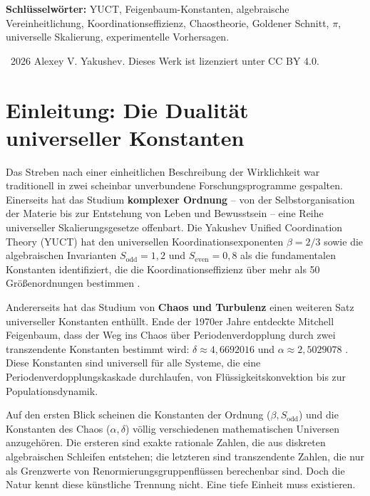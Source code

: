\documentclass[12pt,a4paper]{article}
\begin{document}
	\vspace{1cm}
	\noindent
	\small\textbf{Schlüsselwörter:} YUCT, Feigenbaum-Konstanten, algebraische Vereinheitlichung, Koordinationseffizienz, Chaostheorie, Goldener Schnitt, \(\pi\), universelle Skalierung, experimentelle Vorhersagen.
	
	\vspace{0.5cm}
	\noindent
	\textcopyright\ 2026 Alexey V. Yakushev. Dieses Werk ist lizenziert unter CC BY 4.0.
	
	\tableofcontents
	\newpage
	
	\section{Einleitung: Die Dualität universeller Konstanten}
	
	Das Streben nach einer einheitlichen Beschreibung der Wirklichkeit war traditionell in zwei scheinbar unverbundene Forschungsprogramme gespalten. Einerseits hat das Studium \textbf{komplexer Ordnung} – von der Selbstorganisation der Materie bis zur Entstehung von Leben und Bewusstsein – eine Reihe universeller Skalierungsgesetze offenbart. Die Yakushev Unified Coordination Theory (YUCT) hat den universellen Koordinationsexponenten \(\beta = 2/3\) sowie die algebraischen Invarianten \(S_{\mathrm{odd}} = 1{,}2\) und \(S_{\mathrm{even}} = 0{,}8\) als die fundamentalen Konstanten identifiziert, die die Koordinationseffizienz über mehr als 50 Größenordnungen bestimmen \cite{Yakushev2026, AppendixAF}.
	
	Andererseits hat das Studium von \textbf{Chaos und Turbulenz} einen weiteren Satz universeller Konstanten enthüllt. Ende der 1970er Jahre entdeckte Mitchell Feigenbaum, dass der Weg ins Chaos über Periodenverdopplung durch zwei transzendente Konstanten bestimmt wird: \(\delta \approx 4{,}6692016\) und \(\alpha \approx 2{,}5029078\) \cite{Feigenbaum1978}. Diese Konstanten sind universell für alle Systeme, die eine Periodenverdopplungskaskade durchlaufen, von Flüssigkeitskonvektion bis zur Populationsdynamik.
	
	Auf den ersten Blick scheinen die Konstanten der Ordnung (\(\beta, S_{\mathrm{odd}}\)) und die Konstanten des Chaos (\(\alpha, \delta\)) völlig verschiedenen mathematischen Universen anzugehören. Die ersteren sind exakte rationale Zahlen, die aus diskreten algebraischen Schleifen entstehen; die letzteren sind transzendente Zahlen, die nur als Grenzwerte von Renormierungsgruppenflüssen berechenbar sind. Doch die Natur kennt diese künstliche Trennung nicht. Eine tiefe Einheit muss existieren.
	
\end{document}
